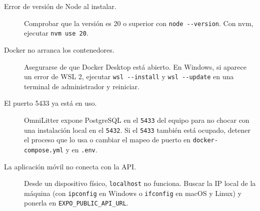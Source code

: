 \begin{description}
  \item[Error de versión de Node al instalar.] Comprobar que la versión es 20 o
    superior con \texttt{node -{}-version}. Con nvm, ejecutar \texttt{nvm use 20}.
  \item[Docker no arranca los contenedores.] Asegurarse de que Docker Desktop está
    abierto. En Windows, si aparece un error de WSL 2, ejecutar \texttt{wsl -{}-install}
    y \texttt{wsl -{}-update} en una terminal de administrador y reiniciar.
  \item[El puerto 5433 ya está en uso.] OmniLitter expone PostgreSQL en el \texttt{5433}
    del equipo para no chocar con una instalación local en el \texttt{5432}. Si el
    \texttt{5433} también está ocupado, detener el proceso que lo usa o cambiar el mapeo
    de puerto en \texttt{docker-compose.yml} y en \texttt{.env}.
  \item[La aplicación móvil no conecta con la API.] Desde un dispositivo físico,
    \texttt{localhost} no funciona. Buscar la IP local de la máquina (con
    \texttt{ipconfig} en Windows o \texttt{ifconfig} en macOS y Linux) y ponerla en
    \texttt{EXPO\_PUBLIC\_API\_URL}.
\end{description}
